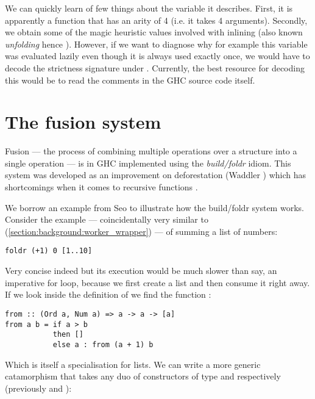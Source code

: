 We can quickly learn of few things about the variable it describes. First,  it is apparently a function that has
an arity of 4 (i.e. it takes 4 arguments). Secondly, we obtain some of the magic heuristic values involved with inlining
(also known \textit{unfolding} hence ). However, if we want to diagnose why for example this variable was evaluated
lazily even though it is always used exactly once, we would have to decode the strictness signature under .
Currently, the best resource for decoding this would be to read the comments in the GHC source code itself.

\section{The fusion system}
\label{section:background:fusion}

Fusion --- the process of combining multiple operations over a structure into a single operation --- is in GHC
implemented using the \textit{build/foldr} idiom. This system was developed as an improvement on deforestation 
(Waddler \cite{WADLER1990231}) which has shortcomings when it comes to recursive functions \cite{shortcut_fusion}.

We borrow an example from Seo \cite{shortcut_fusion_blog} to illustrate how the build/foldr system works. Consider
the example --- coincidentally very similar to  (\cref{section:background:worker_wrapper}) --- of
summing a list of numbers:

\begin{listing}[H]
\begin{verbatim}
foldr (+1) 0 [1..10]
\end{verbatim}
\end{listing}

Very concise indeed but its execution would be much slower than say, an imperative for loop, because we first create
a list and then consume it right away. If we look inside the definition of \mono{[1..10]} we find the function :

\begin{listing}[H]
\begin{verbatim}
from :: (Ord a, Num a) => a -> a -> [a]
from a b = if a > b
           then []
           else a : from (a + 1) b
\end{verbatim}
\end{listing}

Which is itself a specialisation for lists. We can write a more generic catamorphism that takes any duo of constructors
of type  and  respectively (previously \mono{:} and \mono{[]}):

